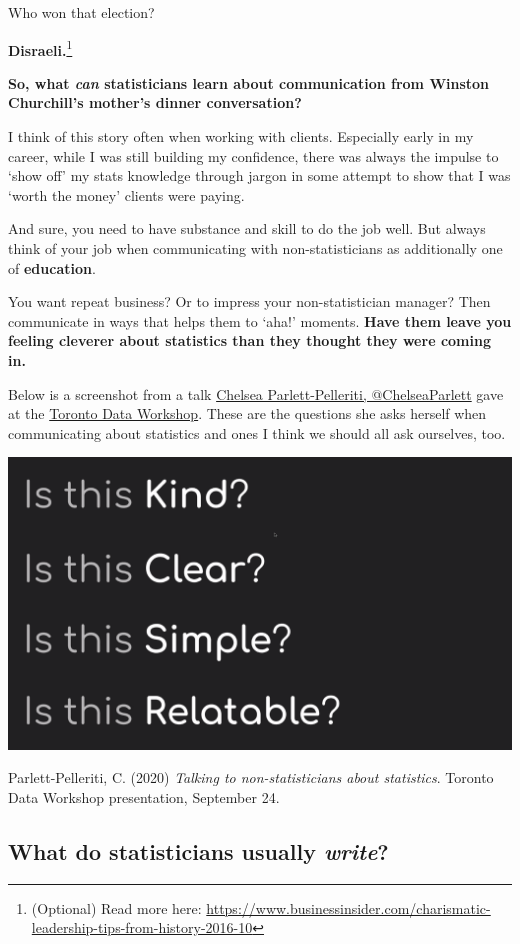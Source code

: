 \documentclass[
  openany]{book}
\begin{document}
Who won that election?

\textbf{Disraeli.}\footnote{(Optional) Read more here: \url{https://www.businessinsider.com/charismatic-leadership-tips-from-history-2016-10}}

\textbf{So, what \emph{can} statisticians learn about communication from Winston Churchill's mother's dinner conversation?}

I think of this story often when working with clients. Especially early in my career, while I was still building my confidence, there was always the impulse to `show off' my stats knowledge through jargon in some attempt to show that I was `worth the money' clients were paying.

And sure, you need to have substance and skill to do the job well. But always think of your job when communicating with non-statisticians as additionally one of \textbf{education}.

You want repeat business? Or to impress your non-statistician manager? Then communicate in ways that helps them to `aha!' moments. \textbf{Have them leave you feeling cleverer about statistics than they thought they were coming in.}

Below is a screenshot from a talk \href{https://twitter.com/ChelseaParlett}{Chelsea Parlett-Pelleriti, @ChelseaParlett} gave at the \href{https://rohanalexander.com/toronto_data_workshop.html}{Toronto Data Workshop}. These are the questions she asks herself when communicating about statistics and ones I think we should all ask ourselves, too.

\begin{center}\includegraphics[width=0.5\linewidth]{images/m2/chelsea} \end{center}

Parlett-Pelleriti, C. (2020) \emph{Talking to non-statisticians about statistics}. Toronto Data Workshop presentation, September 24.

\hypertarget{what-do-statisticians-usually-write}{%
\subsection{\texorpdfstring{What do statisticians usually \emph{write}?}{What do statisticians usually write?}}\label{what-do-statisticians-usually-write}}
\end{document}
